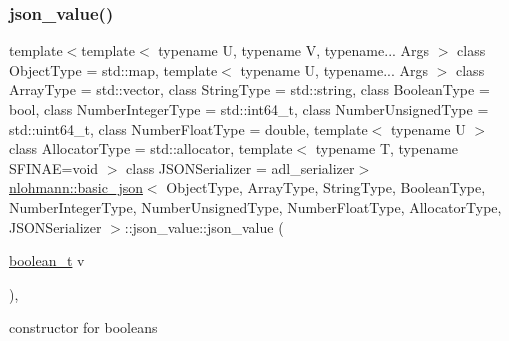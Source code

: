 \subsubsection{\texorpdfstring{json\+\_\+value()}{json\_value()}\hspace{0.1cm}{\footnotesize\ttfamily [2/12]}}
{\footnotesize\ttfamily template$<$template$<$ typename U, typename V, typename... Args $>$ class Object\+Type = std\+::map, template$<$ typename U, typename... Args $>$ class Array\+Type = std\+::vector, class String\+Type  = std\+::string, class Boolean\+Type  = bool, class Number\+Integer\+Type  = std\+::int64\+\_\+t, class Number\+Unsigned\+Type  = std\+::uint64\+\_\+t, class Number\+Float\+Type  = double, template$<$ typename U $>$ class Allocator\+Type = std\+::allocator, template$<$ typename T, typename S\+F\+I\+N\+A\+E=void $>$ class J\+S\+O\+N\+Serializer = adl\+\_\+serializer$>$ \\
\hyperlink{classnlohmann_1_1basic__json}{nlohmann\+::basic\+\_\+json}$<$ Object\+Type, Array\+Type, String\+Type, Boolean\+Type, Number\+Integer\+Type, Number\+Unsigned\+Type, Number\+Float\+Type, Allocator\+Type, J\+S\+O\+N\+Serializer $>$\+::json\+\_\+value\+::json\+\_\+value (\begin{DoxyParamCaption}\item[{\hyperlink{classnlohmann_1_1basic__json_a4c919102a9b4fe0d588af64801436082}{boolean\+\_\+t}}]{v }\end{DoxyParamCaption})\hspace{0.3cm}{\ttfamily [inline]}, {\ttfamily [noexcept]}}



constructor for booleans 

\mbox{\label{unionnlohmann_1_1basic__json_1_1json__value_a590de5a8704d5e3f0dba1cc47b8314a5}} 
